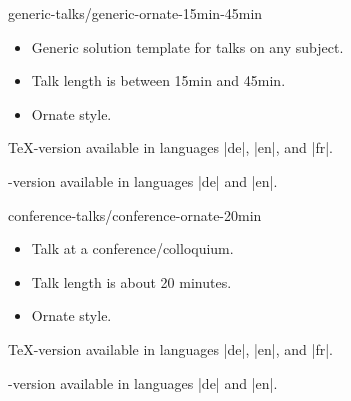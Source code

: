 \begin{solution}{generic-talks/generic-ornate-15min-45min}
  \begin{itemize}
  \item
    Generic solution template for talks on any subject.
  \item
    Talk length is between 15min and 45min.
  \item
    Ornate style.
  \end{itemize}

  \beamernote
  \TeX-version available in languages |de|, |en|, and |fr|.

  \lyxnote
  \LyX-version available in languages |de| and |en|.
\end{solution}

\begin{solution}{conference-talks/conference-ornate-20min}
  \begin{itemize}
  \item
    Talk at a conference/colloquium.
  \item
    Talk length is about 20 minutes.
  \item
    Ornate style.
  \end{itemize}

  \beamernote
  \TeX-version available in languages |de|, |en|, and |fr|.

  \lyxnote
  \LyX-version available in languages |de| and |en|.
\end{solution}
